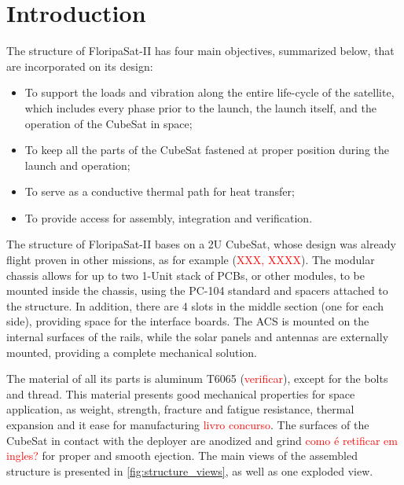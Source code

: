 %
%
%
%
%

%
%
%
%
%
%

\chapter{Introduction} \label{ch:introduction}

The structure of FloripaSat-II has four main objectives, summarized below, that are incorporated on its design:

\begin{itemize}
	\item To support the loads and vibration along the entire life-cycle of the satellite, which includes every phase prior to the launch, the launch itself, and the operation of the CubeSat in space;
	\item To keep all the parts of the CubeSat fastened at proper position during the launch and operation;
	\item To serve as a conductive thermal path for heat transfer;
	\item To provide access for assembly, integration and verification.
\end{itemize}

The structure of FloripaSat-II bases on a 2U CubeSat, whose design was already flight proven in other missions, as for example (\textcolor{red}{XXX, XXXX}). The modular chassis allows for up to two 1-Unit stack of PCBs, or other modules, to be mounted inside the chassis, using the PC-104 standard and spacers attached to the structure. In addition, there are 4 slots in the middle section (one for each side), providing space for the interface boards. The ACS is mounted on the internal surfaces of the rails, while the solar panels and antennas are externally mounted, providing a complete mechanical solution.

The material of all its parts is aluminum T6065 (\textcolor{red}{verificar}), except for the bolts and thread. This material presents good mechanical properties for space application, as weight, strength, fracture and fatigue resistance, thermal expansion and it ease for manufacturing \textcolor{red}{livro concurso}. The surfaces of the CubeSat in contact with the deployer are anodized and grind \textcolor{red}{como é retificar em ingles?} for proper and smooth ejection. The main views of the assembled structure is presented in \autoref{fig:structure_views}, as well as one exploded view.

